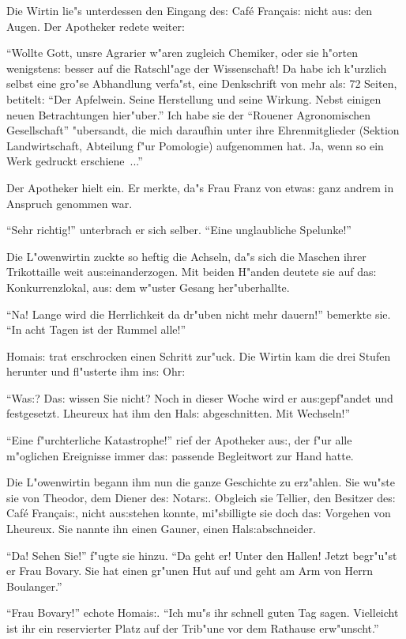 \documentclass[oneside,12pt]{book}
\newcommand{\s}{s:}%
\begin{document}
Die Wirtin lie"s unterdessen den Eingang de{\s} Caf\'e
Fran\c{c}ai{\s} nicht au{\s} den Augen. Der Apotheker redete
weiter:

"`Wollte Gott, unsre Agrarier w"aren zugleich Chemiker, oder sie
h"orten wenigsten{\s} besser auf die Ratschl"age der Wissenschaft!
Da habe ich k"urzlich selbst eine gro"se Abhandlung verfa"st, eine
Denkschrift von mehr al{\s} 72 Seiten, betitelt: "`Der Apfelwein.
Seine Herstellung und seine Wirkung. Nebst einigen neuen
Betrachtungen hier"uber."' Ich habe sie der "`Rouener
Agronomischen Gesellschaft"' "ubersandt, die mich daraufhin unter
ihre Ehrenmitglieder (Sektion Landwirtschaft, Abteilung f"ur
Pomologie) aufgenommen hat. Ja, wenn so ein Werk gedruckt
erschiene~..."'

Der Apotheker hielt ein. Er merkte, da"s Frau Franz von etwa{\s}
ganz andrem in Anspruch genommen war.

"`Sehr richtig!"' unterbrach er sich selber. "`Eine unglaubliche
Spelunke!"'

Die L"owenwirtin zuckte so heftig die Achseln, da"s sich die
Maschen ihrer Trikottaille weit au{\s}\-ein\-an\-der\-zogen. Mit
beiden H"anden deutete sie auf da{\s} Konkurrenzlokal, au{\s} dem
w"uster Gesang her"uberhallte.

"`Na! Lange wird die Herrlichkeit da dr"uben nicht mehr dauern!"'
bemerkte sie. "`In acht Tagen ist der Rummel alle!"'

Homai{\s} trat erschrocken einen Schritt zur"uck. Die Wirtin kam
die drei Stufen herunter und fl"usterte ihm in{\s} Ohr:

"`Wa{\s}? Da{\s} wissen Sie nicht? Noch in dieser Woche wird er
au{\s}gepf"andet und festgesetzt. Lheureux hat ihm den Hal{\s}
abgeschnitten. Mit Wechseln!"'

"`Eine f"urchterliche Katastrophe!"' rief der Apotheker au{\s},
der f"ur alle m"oglichen Ereignisse immer da{\s} passende
Begleitwort zur Hand hatte.

Die L"owenwirtin begann ihm nun die ganze Geschichte zu erz"ahlen.
Sie wu"ste sie von Theodor, dem Diener de{\s} Notar{\s}. Obgleich
sie Tellier, den Besitzer de{\s} Caf\'e Fran\c{c}ai{\s}, nicht
au{\s}stehen konnte, mi"sbilligte sie doch da{\s} Vorgehen von
Lheureux. Sie nannte ihn einen Gauner, einen Hal{\s}abschneider.

"`Da! Sehen Sie!"' f"ugte sie hinzu. "`Da geht er! Unter den
Hallen! Jetzt begr"u"st er Frau Bovary. Sie hat einen gr"unen Hut
auf und geht am Arm von Herrn Boulanger."'

"`Frau Bovary!"' echote Homai{\s}. "`Ich mu"s ihr schnell guten
Tag sagen. Vielleicht ist ihr ein reservierter Platz auf der
Trib"une vor dem Rathause erw"unscht."'
\end{document}

